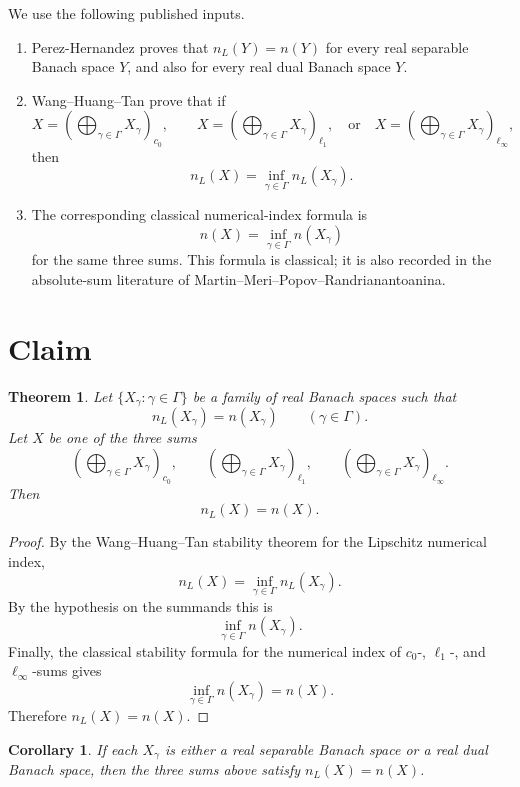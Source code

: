\documentclass[11pt]{article}
\newtheorem{theorem}{Theorem}
\newtheorem{corollary}{Corollary}
\begin{document}
We use the following published inputs.

\begin{enumerate}
\item Perez-Hernandez proves that \(n_L(Y)=n(Y)\) for every real separable
Banach space \(Y\), and also for every real dual Banach space \(Y\).
\item Wang--Huang--Tan prove that if
\[
  X=\left(\bigoplus_{\gamma\in\Gamma}X_\gamma\right)_{c_0},\qquad
  X=\left(\bigoplus_{\gamma\in\Gamma}X_\gamma\right)_{\ell_1},
  \quad\text{or}\quad
  X=\left(\bigoplus_{\gamma\in\Gamma}X_\gamma\right)_{\ell_\infty},
\]
then
\[
  n_L(X)=\inf_{\gamma\in\Gamma} n_L(X_\gamma).
\]
\item The corresponding classical numerical-index formula is
\[
  n(X)=\inf_{\gamma\in\Gamma} n(X_\gamma)
\]
for the same three sums. This formula is classical; it is also recorded in
the absolute-sum literature of Martin--Meri--Popov--Randrianantoanina.
\end{enumerate}

\section*{Claim}

\begin{theorem}
Let \(\{X_\gamma:\gamma\in\Gamma\}\) be a family of real Banach spaces such
that
\[
  n_L(X_\gamma)=n(X_\gamma)
  \qquad(\gamma\in\Gamma).
\]
Let \(X\) be one of the three sums
\[
  \left(\bigoplus_{\gamma\in\Gamma}X_\gamma\right)_{c_0},\qquad
  \left(\bigoplus_{\gamma\in\Gamma}X_\gamma\right)_{\ell_1},\qquad
  \left(\bigoplus_{\gamma\in\Gamma}X_\gamma\right)_{\ell_\infty}.
\]
Then
\[
  n_L(X)=n(X).
\]
\end{theorem}

\begin{proof}
By the Wang--Huang--Tan stability theorem for the Lipschitz numerical index,
\[
  n_L(X)=\inf_{\gamma\in\Gamma} n_L(X_\gamma).
\]
By the hypothesis on the summands this is
\[
  \inf_{\gamma\in\Gamma} n(X_\gamma).
\]
Finally, the classical stability formula for the numerical index of
\(c_0\)-, \(\ell_1\)-, and \(\ell_\infty\)-sums gives
\[
  \inf_{\gamma\in\Gamma} n(X_\gamma)=n(X).
\]
Therefore \(n_L(X)=n(X)\).
\end{proof}

\begin{corollary}
If each \(X_\gamma\) is either a real separable Banach space or a real dual
Banach space, then the three sums above satisfy \(n_L(X)=n(X)\).
\end{corollary}
\end{document}
